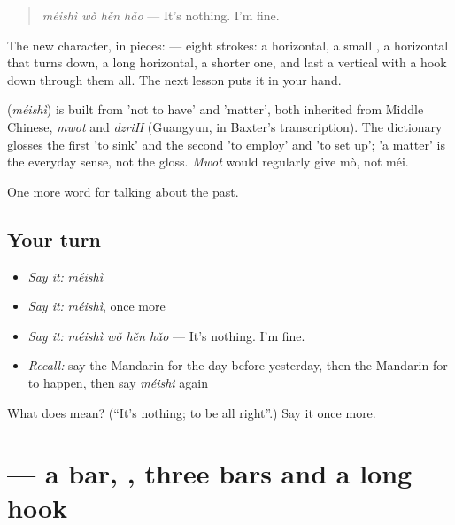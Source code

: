 \begin{quote}
\textbf{} \emph{méishì wǒ hěn hǎo} — It's nothing. I'm fine.
\end{quote}

The new character, in pieces:  — eight strokes: a horizontal, a small , a horizontal that turns down, a long horizontal, a shorter one, and last a vertical with a hook down through them all. The next lesson puts it in your hand.

\begin{cousinweb}
\textbf{} (\emph{méishì}) is built from  'not to have' and  'matter', both inherited from Middle Chinese, \emph{mwot} and \emph{dzriH} (Guangyun, in Baxter's transcription). The dictionary glosses the first 'to sink' and the second 'to employ' and 'to set up'; 'a matter' is the everyday sense, not the gloss. \emph{Mwot} would regularly give mò, not méi.
\end{cousinweb}

\begin{grammarlens}[title={What you've built}]
One more word for talking about the past.
\end{grammarlens}

\subsection*{Your turn}
\begin{itemize}
\raggedright
  \item \emph{Say it:} \emph{méishì}
  \item \emph{Say it:} \emph{méishì}, once more
  \item \emph{Say it:} \emph{méishì wǒ hěn hǎo} — It's nothing. I'm fine.
  \item \emph{Recall:} say the Mandarin for the day before yesterday, then the Mandarin for to happen, then say \emph{méishì} again
\end{itemize}

\begin{tcolorbox}[breakable,colback=teal!4,colframe=teal!35!black,title={Before you move on}]
What does  mean? (\textquotedblleft{}It's nothing; to be all right\textquotedblright{}.) Say it once more.
\end{tcolorbox}
\section[\texorpdfstring{\zh{事} (shì)}{事 (shì)}]{ — a bar, , three bars and a long hook}

